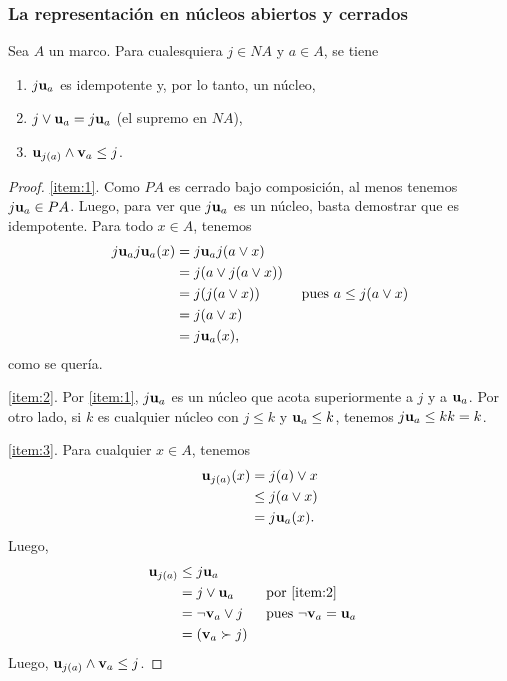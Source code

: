 \subsubsection{La representación en núcleos abiertos y cerrados}

\begin{lemma}
    \label{lemma:sup-nuc-cerrado}
  Sea $A$ un marco.
  Para cualesquiera $j\in NA$ y $a\in A$, se tiene
  \begin{enumerate}%
    \item\label{item:1} $j\mathbf u_{a}$ es idempotente y, por lo tanto, un núcleo,
    \item\label{item:2} $j\vee\mathbf u_{a} = j\mathbf u_{a}$ (el supremo en $NA$),
    \item\label{item:3} $\mathbf u_{j(a)}\wedge\mathbf v_{a}\leq j$.
  \end{enumerate}
\end{lemma}
\begin{proof}
  \ref{item:1}. Como $PA$ es cerrado bajo composición, al menos tenemos
  $j\mathbf u_{a}\in PA$.
  Luego, para ver que $j\mathbf u_{a}$ es un núcleo,
  basta demostrar que es idempotente.
  Para todo $x\in A$, tenemos
  \begin{align*}
    j\mathbf u_{a} j\mathbf u_{a} (x)
    &= j\mathbf u_{a} j(a\vee x) \\
    &= j(a\vee j(a\vee x)) \\
    &= j(j(a\vee x))
      & \text{ pues } a\leq j(a\vee x) \\
    &= j(a\vee x) \\
    &= j\mathbf u_{a} (x),
  \end{align*}
  como se quería.

  \ref{item:2}. Por \ref{item:1}, $j\mathbf u_{a}$ es un núcleo que acota
  superiormente a $j$ y a $\mathbf u_{a}$.
  Por otro lado, si $k$ es cualquier núcleo con $j\leq k$ y
  $\mathbf u_{a}\leq k$, tenemos $j\mathbf u_{a} \leq kk=k$.

  \ref{item:3}. Para cualquier $x\in A$, tenemos
  \begin{align*}
    \mathbf u_{j(a)}(x)
    &= j(a)\vee x \\
    &\leq j(a \vee x) \\
    &= j\mathbf u_{a}(x).
  \end{align*}
  Luego,
  \begin{align*}
    \mathbf u_{j(a)}
    &\leq j\mathbf u_{a} \\
    &= j\vee \mathbf u_{a} && \text{ por \ref{item:2}} \\
    &= \neg \mathbf v_{a} \vee j
      && \text{ pues } \neg\mathbf v_{a} = \mathbf u_{a} \\
    &= (\mathbf v_{a} \succ j)
  \end{align*}
  Luego, $\mathbf u_{j(a)} \wedge \mathbf v_{a} \leq j$.
\end{proof}

